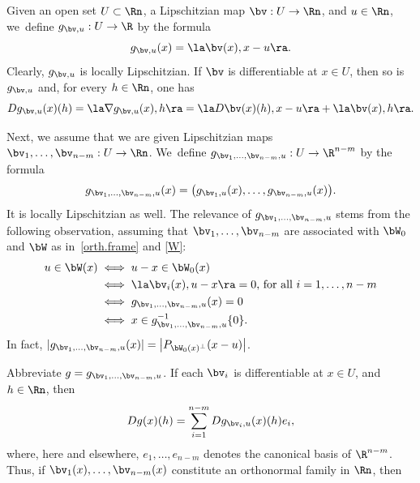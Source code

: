 \begin{Empty}
Given an open set $U \subset \Rn$, a Lipschitzian map $\bv: U \to \Rn$, and $u \in \Rn$, we~define $g_{\bv,u}: U \to \R$ by the formula
\begin{equation*}
g_{\bv,u}(x) = \la \bv(x), x-u \ra.
\end{equation*}
Clearly, $g_{\bv,u}$ is locally Lipschitzian.
If $\bv$ is differentiable at $x \in U$, then so is $g_{\bv,u}$ and, for every $h \in \Rn$, one has
\begin{equation}
\label{eq.2}
Dg_{\bv,u}(x)(h) = \la \nabla g_{\bv,u}(x),h \ra = \la D\bv(x)(h), x-u \ra + \la \bv(x), h \ra.
\end{equation}
\par
Next, we assume that we are given Lipschitzian maps $\bv_1,\ldots,\bv_{n-m}: U \to \Rn$.
We~define $g_{\bv_1,\ldots,\bv_{n-m},u}: U \to \R^{n-m}$ by the formula
\begin{equation*}
g_{\bv_1,\ldots,\bv_{n-m},u}(x) = \bigl(g_{\bv_1,u}(x), \ldots, g_{\bv_{n-m},u}(x) \bigr).
\end{equation*}
It is locally Lipschitzian as well.
The relevance of $g_{\bv_1,\ldots,\bv_{n-m},u}$ stems from the following observation, assuming that $\bv_1,\ldots,\bv_{n-m}$ are associated with $\bW_0$ and $\bW$ as in~\ref{orth.frame} and \ref{W}:
\begin{equation}
\label{eq.7}
\begin{split}
u \in \bW(x) & \iff u-x \in \bW_0(x) \\
& \iff \la \bv_i(x), u-x \ra = 0 \text{, for all } i=1,\ldots,n-m \\
& \iff g_{\bv_1,\ldots,\bv_{n-m},u}(x)=0 \\
& \iff x \in g_{\bv_1,\ldots,\bv_{n-m},u}^{-1}\{0\}.
\end{split}
\end{equation}
In fact, $|g_{\bv_1,\ldots,\bv_{n-m},u}(x)| = \left| P_{\bW_0(x)^\perp}(x-u)\right|$.
\par
Abbreviate $g = g_{\bv_1,\ldots,\bv_{n-m},u}$.
If each $\bv_i$ is differentiable at $x \in U$, and $h \in \Rn$, then
\begin{equation*}
Dg(x)(h) = \sum_{i=1}^{n-m} Dg_{\bv_i,u}(x)(h)e_i,
\end{equation*}
where, here and elsewhere, $e_1,\ldots,e_{n-m}$ denotes the canonical basis of $\R^{n-m}$.
Thus, if $\bv_1(x),\ldots,\bv_{n-m}(x)$ constitute an orthonormal family in $\Rn$, then
\begin{equation*}

\end{equation*}
\end{Empty}
